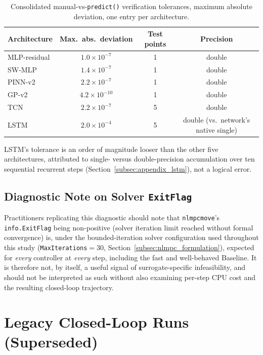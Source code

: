 \begin{table}[H]
\centering
\caption{Consolidated manual-vs-\texttt{predict()} verification
tolerances, maximum absolute deviation, one entry per architecture.}
\label{tab:verification_tolerances}
\begin{tabular}{lccc}
\toprule
Architecture & Max.\ abs.\ deviation & Test points & Precision \\
\midrule
MLP-residual & $1.0\times10^{-7}$ & 1 & double \\
SW-MLP       & $1.4\times10^{-7}$ & 1 & double \\
PINN-v2      & $2.2\times10^{-7}$ & 1 & double \\
GP-v2        & $4.2\times10^{-10}$ & 1 & double \\
TCN          & $2.2\times10^{-7}$ & 5 & double \\
LSTM         & $2.0\times10^{-4}$ & 5 & double (vs.\ network's
  native single) \\
\bottomrule
\end{tabular}

\vspace{4pt}
{\footnotesize LSTM's tolerance is an order of magnitude looser than
the other five architectures, attributed to single- versus
double-precision accumulation over ten sequential recurrent steps
(Section~\ref{subsec:appendix_lstm}), not a logical error.}
\end{table}

\subsection{Diagnostic Note on Solver \texttt{ExitFlag}}
\label{subsec:appendix_exitflag}

Practitioners replicating this diagnostic should note that
\texttt{nlmpcmove}'s \texttt{info.ExitFlag} being non-positive (solver
iteration limit reached without formal convergence) is, under the
bounded-iteration solver configuration used throughout this study
(\texttt{MaxIterations}$=30$, Section~\ref{subsec:nlmpc_formulation}),
expected for \emph{every} controller at \emph{every} step, including
the fast and well-behaved Baseline. It is therefore not, by itself, a
useful signal of surrogate-specific infeasibility, and should not be
interpreted as such without also examining per-step CPU cost and the
resulting closed-loop trajectory.


\section{Legacy Closed-Loop Runs (Superseded)}
\label{sec:appendix_legacy_runs}

